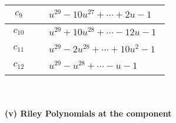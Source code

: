 \documentclass[1p]{elsarticle_modified}
\theoremstyle{definition}
\begin{document}
\begin{tabular}{m{50pt}|m{274pt}}
\hline $$\begin{aligned}c_{9}\end{aligned}$$&$\begin{aligned}
&u^{29}-10 u^{27}+\cdots+2 u-1
\end{aligned}$\\
\hline $$\begin{aligned}c_{10}\end{aligned}$$&$\begin{aligned}
&u^{29}+10 u^{28}+\cdots-12 u-1
\end{aligned}$\\
\hline $$\begin{aligned}c_{11}\end{aligned}$$&$\begin{aligned}
&u^{29}-2 u^{28}+\cdots+10 u^2-1
\end{aligned}$\\
\hline $$\begin{aligned}c_{12}\end{aligned}$$&$\begin{aligned}
&u^{29}- u^{28}+\cdots- u-1
\end{aligned}$\\
\hline
\end{tabular}\\~\\
\newpage\renewcommand{\arraystretch}{1}
\flushleft \textbf{(v) Riley Polynomials at the component}\newline \\
\end{document}
